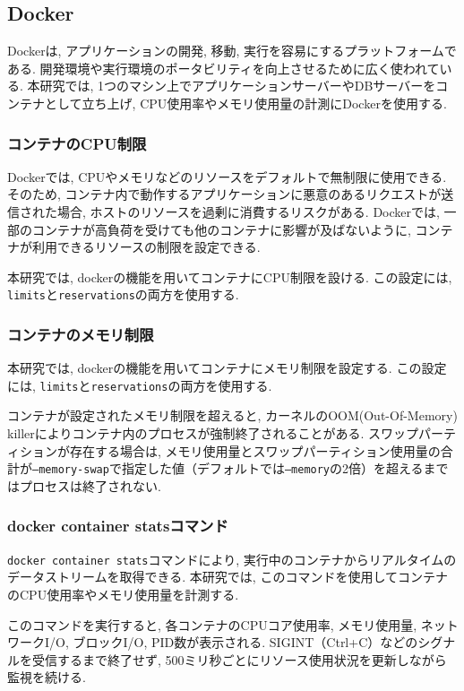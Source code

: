 \documentclass[../../../main]{subfiles}
\begin{document}
    \subsection{Docker}\label{subsec:phraseology-docker}

    Dockerは, アプリケーションの開発, 移動, 実行を容易にするプラットフォームである. 開発環境や実行環境のポータビリティを向上させるために広く使われている. 本研究では, 1つのマシン上でアプリケーションサーバーやDBサーバーをコンテナとして立ち上げ, CPU使用率やメモリ使用量の計測にDockerを使用する. \cite{Docker概要}

    \subsubsection{コンテナのCPU制限}\label{subsubsec:phraseology-docker-cpu-limit}

    Dockerでは, CPUやメモリなどのリソースをデフォルトで無制限に使用できる. そのため, コンテナ内で動作するアプリケーションに悪意のあるリクエストが送信された場合, ホストのリソースを過剰に消費するリスクがある. Dockerでは, 一部のコンテナが高負荷を受けても他のコンテナに影響が及ばないように, コンテナが利用できるリソースの制限を設定できる. \cite{DockerKubernetes}

    本研究では, dockerの機能を用いてコンテナにCPU制限を設ける. この設定には, \texttt{limits}と\texttt{reservations}の両方を使用する. \cite{Docker制限}

    \subsubsection{コンテナのメモリ制限}\label{subsubsec:phraseology-docker-memory-limit}

    本研究では, dockerの機能を用いてコンテナにメモリ制限を設定する. この設定には, \texttt{limits}と\texttt{reservations}の両方を使用する. \cite{Docker制限}

    コンテナが設定されたメモリ制限を超えると, カーネルのOOM(Out-Of-Memory) killerによりコンテナ内のプロセスが強制終了されることがある. スワップパーティションが存在する場合は, メモリ使用量とスワップパーティション使用量の合計が\texttt{--memory-swap}で指定した値（デフォルトでは\texttt{--memory}の2倍）を超えるまではプロセスは終了されない. \cite{DockerKubernetes}

    \subsubsection{docker container statsコマンド}\label{subsubsec:phraseology-docker-container-stats}

    \texttt{docker container stats}コマンドにより, 実行中のコンテナからリアルタイムのデータストリームを取得できる. 本研究では, このコマンドを使用してコンテナのCPU使用率やメモリ使用量を計測する. \cite{Docker Stats}

    このコマンドを実行すると, 各コンテナのCPUコア使用率, メモリ使用量, ネットワークI/O, ブロックI/O, PID数が表示される. SIGINT（Ctrl+C）などのシグナルを受信するまで終了せず, 500ミリ秒ごとにリソース使用状況を更新しながら監視を続ける. \cite{DockerKubernetes}
\end{document}
